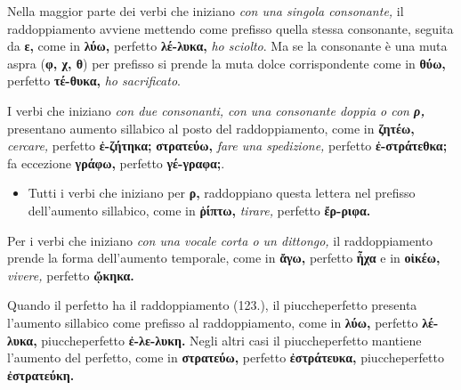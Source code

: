 \documentclass[nols]{tufte-handout}
\newcommand{\textls}[2][5]{%
    \begingroup\addfontfeatures{LetterSpace=#1}#2\endgroup
  }
\renewcommand{\smallcapsspacing}[1]{\textls[10]{#1}}
\renewcommand{\textsc}[1]{\smallcapsspacing{\textsmallcaps{#1}}}
\begin{document}
 Nella maggior parte dei verbi che iniziano \textit{con una singola consonante,} il raddoppiamento avviene mettendo come prefisso quella stessa consonante, seguita da \textbf{ε,} come in \textbf{λύω,} perfetto \textbf{λέ-λυκα,} \textit{ho sciolto}. 
Ma se la consonante è una muta aspra (\textbf{φ, χ, θ}) per prefisso si prende la muta dolce corrispondente
come in \textbf{θύω,} perfetto \textbf{τέ-θυκα,} \textit{ho sacrificato}.

 I verbi che iniziano \textit{con due consonanti, con una consonante doppia o con \textbf{ρ,}} presentano aumento sillabico al posto del raddoppiamento, 
come in \textbf{ζητέω,} \textit{cercare,} perfetto \textbf{ἐ-ζήτηκα;}
\textbf{στρατεύω,} \textit{fare una spedizione,} perfetto \textbf{ἐ-στράτεθκα;} 
fa eccezione \textbf{γράφω,} perfetto \textbf{γέ-γραφα;}.
\begin{itemize}
\item[\textsc{1.}] Tutti i verbi che iniziano per \textbf{ρ,} raddoppiano questa lettera nel prefisso dell'aumento sillabico, come in \textbf{ῥίπτω,} \textit{tirare,} perfetto \textbf{ἔρ-ριφα.}  
\end{itemize}

 Per i verbi che iniziano \textit{con una vocale corta o un dittongo,} il raddoppiamento prende la forma dell'aumento temporale, come in \textbf{ἄγω,} perfetto \textbf{ἦχα} e in \textbf{οἰκέω,} \textit{vivere,} perfetto \textbf{ᾤκηκα.}

\newpage

 Quando il perfetto ha il raddoppiamento (123.), il piuccheperfetto presenta l'aumento sillabico come prefisso al raddoppiamento, come in \textbf{λύω,} perfetto \textbf{λέ-λυκα,} piuccheperfetto \textbf{ἐ-λε-λυκη.} Negli altri casi il piuccheperfetto mantiene l'aumento del perfetto, come in \textbf{στρατεύω,} perfetto \textbf{ἐστράτευκα,} piuccheperfetto \textbf{ἐστρατεύκη.}

\end{document}
